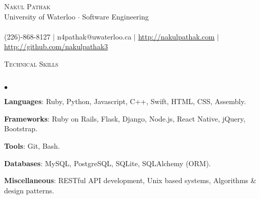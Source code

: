 \documentclass[10pt]{article}
\newcommand{\lineunder}{\vspace*{-8pt} \\ \hspace*{-18pt} \hrulefill \\}
\newcommand{\header}[1]{{\hspace*{-15pt}\vspace*{6pt} \textsc{#1}} \vspace*{-6pt} \lineunder }
\newenvironment{achievements}{\begin{list}{$\bullet$}{\topsep 0pt \itemsep -1.5pt \leftmargin 5pt}}{\vspace*{4pt}\end{list}}
\begin{document}
\small
\smallskip
\vspace*{-45pt}

\begin{center}
	{\Huge \scshape {Nakul Pathak}} \\
	\vspace*{6pt} 
{\fontsize{10}{1}\selectfont University of Waterloo $\cdot$ Software Engineering} \\
\vspace{-4pt}
\hspace*{-18pt} \hrulefill \\
\vspace{2pt}
\hspace*{-18pt} (226)-868-8127 $|$ n4pathak@uwaterloo.ca $|$ \url{http://nakulpathak.com} $|$  \url{http://github.com/nakulpathak3}
\vspace{-5pt}
\end{center}

\vspace{8pt}

\header{\fontsize{11}{12}\selectfont Technical Skills}
\begin{achievements}
\item \textbf{Languages}: Ruby, Python, Javascript, C++, Swift, HTML, CSS, Assembly.
\item \textbf{Frameworks}: Ruby on Rails, Flask, Django, Node.js, React Native, jQuery, Bootstrap.
\item \textbf{Tools}: Git, Bash.
\item \textbf{Databases}: MySQL, PostgreSQL, SQLite, SQLAlchemy (ORM).
\item \textbf{Miscellaneous}: RESTful API development, Unix based systems, Algorithms \& design patterns.
\end{achievements}

\vspace{8pt}
\end{document}
